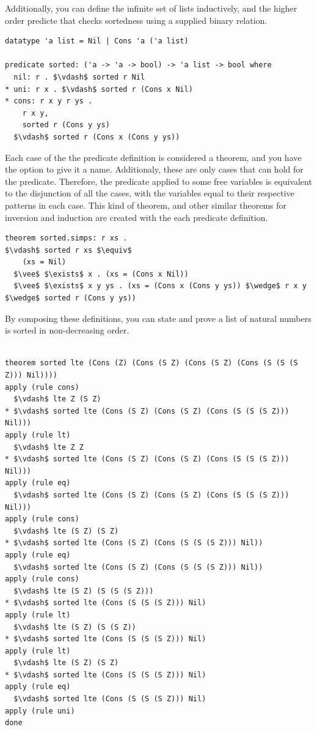 \documentclass[letterpaper, 11pt]{extarticle}
\begin{document}
Additionally, you can define the infinite set of lists inductively, and the higher order predicte that checks
sortedness using a supplied binary relation.

\begin{lstlisting}[language=logic]
datatype 'a list = Nil | Cons 'a ('a list)

predicate sorted: ('a -> 'a -> bool) -> 'a list -> bool where
  nil: r . $\vdash$ sorted r Nil
* uni: r x . $\vdash$ sorted r (Cons x Nil)
* cons: r x y r ys .
    r x y,
    sorted r (Cons y ys)
  $\vdash$ sorted r (Cons x (Cons y ys))
\end{lstlisting}

Each case of the the predicate definition is considered a theorem, and you have the option to give it a name. 
Additionaly, these are only cases that can hold for the predicate.  Therefore, the predicate applied to some free
variables is equivalent to the disjunction of all the cases, with the variables equal to their respective patterns
in each case. This kind of theorem, and other similar theorems for inversion and induction
are created with the each predicate definition.

\begin{lstlisting}[language=logic]
theorem sorted.simps: r xs .
$\vdash$ sorted r xs $\equiv$
    (xs = Nil)
  $\vee$ $\exists$ x . (xs = (Cons x Nil))
  $\vee$ $\exists$ x y ys . (xs = (Cons x (Cons y ys)) $\wedge$ r x y $\wedge$ sorted r (Cons y ys))
\end{lstlisting}

By composing these definitions, you can state and prove a list of natural numbers is sorted in non-decreasing order.

\begin{lstlisting}[language=logic]

theorem sorted lte (Cons (Z) (Cons (S Z) (Cons (S Z) (Cons (S (S (S Z))) Nil))))
apply (rule cons)
  $\vdash$ lte Z (S Z)
* $\vdash$ sorted lte (Cons (S Z) (Cons (S Z) (Cons (S (S (S Z))) Nil)))
apply (rule lt)
  $\vdash$ lte Z Z
* $\vdash$ sorted lte (Cons (S Z) (Cons (S Z) (Cons (S (S (S Z))) Nil)))
apply (rule eq)
  $\vdash$ sorted lte (Cons (S Z) (Cons (S Z) (Cons (S (S (S Z))) Nil)))
apply (rule cons)
  $\vdash$ lte (S Z) (S Z)
* $\vdash$ sorted lte (Cons (S Z) (Cons (S (S (S Z))) Nil))
apply (rule eq)
  $\vdash$ sorted lte (Cons (S Z) (Cons (S (S (S Z))) Nil))
apply (rule cons)
  $\vdash$ lte (S Z) (S (S (S Z)))
* $\vdash$ sorted lte (Cons (S (S (S Z))) Nil)
apply (rule lt)
  $\vdash$ lte (S Z) (S (S Z))
* $\vdash$ sorted lte (Cons (S (S (S Z))) Nil)
apply (rule lt)
  $\vdash$ lte (S Z) (S Z)
* $\vdash$ sorted lte (Cons (S (S (S Z))) Nil)
apply (rule eq)
  $\vdash$ sorted lte (Cons (S (S (S Z))) Nil)
apply (rule uni)
done
\end{lstlisting}
\end{document}
